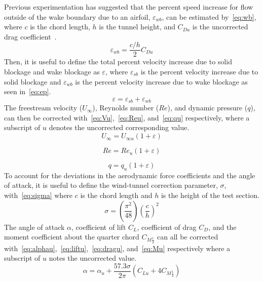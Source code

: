 \documentclass[journal,letterpaper]{IEEEtran}
\begin{document}
Previous experimentation has suggested that the percent speed increase for flow outside of the wake boundary due to an airfoil, $\varepsilon_{wb}$, can be estimated by~\eqref{eq:wb}, where $c$ is the chord length, $h$ is the tunnel height, and $C_{Du}$ is the uncorrected drag coefficient~\cite{lab5r1}.
\begin{equation} \label{eq:wb}
    \varepsilon_{wb} = \frac{c/h}{2}C_{Du}
\end{equation}
Then, it is useful to define the total percent velocity increase due to solid blockage and wake blockage as $\varepsilon$, where $\varepsilon_{sb}$ is the percent velocity increase due to solid blockage and $\varepsilon_{wb}$ is the percent velocity increase due to wake blockage as seen in~\eqref{eq:ep}.
\begin{equation} \label{eq:ep}
    \varepsilon = \varepsilon_{sb} + \varepsilon_{wb}
\end{equation}
The freestream velocity ($U_\infty$), Reynolds number ($Re$), and dynamic pressure ($q$), can then be corrected with~\eqref{eq:Vu},~\eqref{eq:Reu}, and~\eqref{eq:qu} respectively, where a subscript of $u$ denotes the uncorrected corresponding value.
\begin{equation} \label{eq:Vu}
    U_\infty = U_{\infty u}(1 + \varepsilon)
\end{equation}

\begin{equation} \label{eq:Reu}
    Re = Re_u(1 + \varepsilon)
\end{equation}

\begin{equation} \label{eq:qu}
    q = q_u(1 + \varepsilon)
\end{equation}
To account for the deviations in the aerodynamic force coefficients and the angle of attack, it is useful to define the wind-tunnel correction parameter, $\sigma$, with~\eqref{eq:sigma} where $c$ is the chord length and $h$ is the height of the test section.
\begin{equation} \label{eq:sigma}
    \sigma = \left(\frac{\pi^2}{48}\right)\left(\frac{c}{h}\right)^2
\end{equation}
The angle of attack $\alpha$, coefficient of lift $C_L$, coefficient of drag $C_D$, and the moment coefficient about the quarter chord $C_{M\frac{1}{4}}$ can all be corrected with~\eqref{eq:alphau},~\eqref{eq:liftu},~\eqref{eq:dragu}, and~\eqref{eq:Mu} respectively where a subscript of $u$ notes the uncorrected value.
\begin{equation} \label{eq:alphau}
    \alpha = \alpha_u + \frac{57.3\sigma}{2\pi} \left(C_{Lu} + 4C_{M\frac{1}{4}}\right)
\end{equation}
\end{document}
